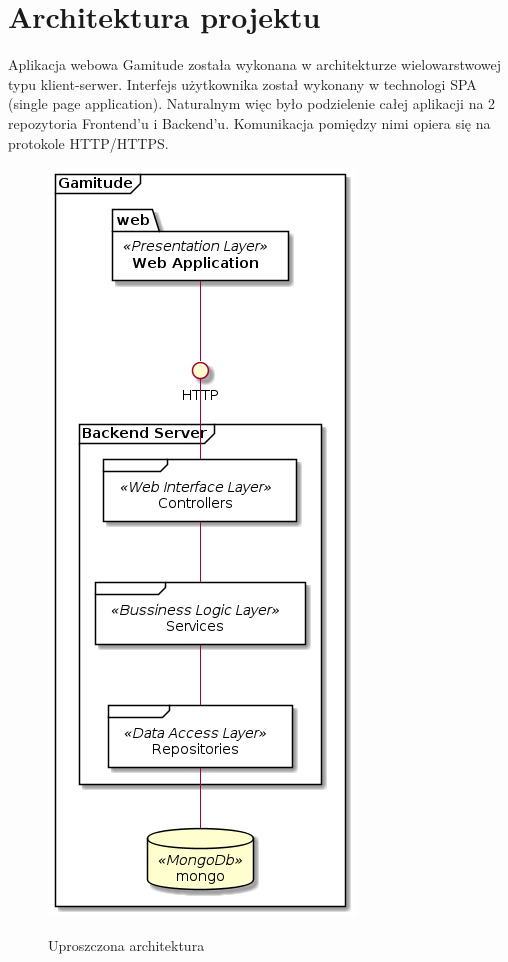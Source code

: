 \documentclass[a4paper,11pt]{report}
\begin{document}
\section {Architektura projektu}
Aplikacja webowa Gamitude została wykonana w architekturze wielowarstwowej typu klient-serwer.
Interfejs użytkownika został wykonany w technologi SPA (single page application).
Naturalnym więc było podzielenie całej aplikacji na 2 repozytoria Frontend'u i Backend'u.
Komunikacja pomiędzy nimi opiera się na protokole HTTP/HTTPS.\\
\begin{figure}[H]
	\centering
	\includegraphics[scale=0.3]{gamitude_overview}\\
	\caption{Uproszczona architektura}
	\label{fig:overwiewarch}
\end{figure}
\end{document}
